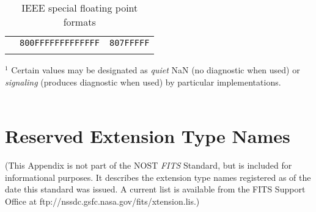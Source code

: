 \begin{table}[htpb]
\begin{center}
\begin{tabular}{lcc}
                        & {\tt 800FFFFFFFFFFFFF} & {\tt 807FFFFF} \\
                        &                                         \\ \hline
\end{tabular}
\end{center}
$^1$ Certain values may be designated as {\em quiet} NaN (no
diagnostic when used) or {\em signaling} (produces diagnostic when
used) by particular implementations. \\ \\
\caption[IEEE special floating point formats]{IEEE special floating point
formats}
\label{t:ieee}
\end{table}



\chapter{Reserved Extension Type Names}
   
   (This Appendix is not part of the NOST {\em FITS\/} Standard, 
   but 
   is included for
   informational purposes.  It describes
   the extension type names registered as of the date this standard
   was issued.  A current list is available from the FITS Support 
   Office at ftp://nssdc.gsfc.nasa.gov/fits/xtension.lis.)

\label{s:resn}    

